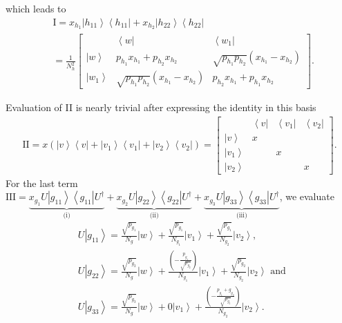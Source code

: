 \documentclass{theoretics}
\begin{document}
which leads to 
\begin{align*}
&\text{I}  =x_{h_{1}}\left|h_{11}\right\rangle \left\langle h_{11}\right|+x_{h_{2}}\left|h_{22}\right\rangle \left\langle h_{22}\right|\\
&=\frac{1}{N_{h}^{2}}\left[\begin{array}{c|cc}
& \left\langle w\right| & \left\langle w_{1}\right|\\
\hline \left|w\right\rangle  & p_{h_{1}}x_{h_{1}}+p_{h_{2}}x_{h_{2}} & \sqrt{p_{h_{1}}p_{h_{2}}}(x_{h_{1}}-x_{h_{2}})\\
\left|w_{1}\right\rangle  & \sqrt{p_{h_{1}}p_{h_{2}}}(x_{h_{1}}-x_{h_{2}}) & p_{h_{2}}x_{h_{1}}+p_{h_{1}}x_{h_{2}}
\end{array}\right].
\end{align*}

Evaluation
of II is nearly trivial after expressing the identity in this basis
\begin{align*}
\text{II}  =x(\left|v\right\rangle \left\langle v\right|+\left|v_{1}\right\rangle \left\langle v_{1}\right|+\left|v_{2}\right\rangle \left\langle v_{2}\right|)=\left[\begin{array}{c|ccc}
& \left\langle v\right| & \left\langle v_{1}\right| & \left\langle v_{2}\right|\\
\hline \left|v\right\rangle  & x\\
\left|v_{1}\right\rangle  &  & x\\
\left|v_{2}\right\rangle  &  &  & x
\end{array}\right].
\end{align*}
For the last term 
$
\text{III}=\underbrace{x_{g_{1}}U\left|g_{11}\right\rangle \left\langle g_{11}\right|U^{\dagger}}_{\text{(i)}}+\underbrace{x_{g_{2}}U\left|g_{22}\right\rangle \left\langle g_{22}\right|U^{\dagger}}_{\text{(ii)}}+\underbrace{x_{g_{3}}U\left|g_{33}\right\rangle \left\langle g_{33}\right|U^{\dagger}}_{\text{(iii)}}
$, 
we evaluate 
\begin{align*}
&U\left|g_{11}\right\rangle   =\frac{\sqrt{p_{g_{1}}}}{N_{g}}\left|w\right\rangle +\frac{\sqrt{p_{g_{1}}}}{N_{g_{1}}}\left|v_{1}\right\rangle +\frac{\sqrt{p_{g_{1}}}}{N_{g_{2}}}\left|v_{2}\right\rangle, \\
&U\left|g_{22}\right\rangle   =\frac{\sqrt{p_{g_{2}}}}{N_{g}}\left|w\right\rangle +\frac{\left(-\frac{p_{g_{1}}}{\sqrt{p_{g_{2}}}}\right)}{N_{g_{1}}}\left|v_{1}\right\rangle +\frac{\sqrt{p_{g_{2}}}}{N_{g_{2}}}\left|v_{2}\right\rangle \text{ and } \\
&U\left|g_{33}\right\rangle   =\frac{\sqrt{p_{g_{3}}}}{N_{g}}\left|w\right\rangle +0\left|v_{1}\right\rangle +\frac{\left(-\frac{p_{g_{1}}+g_{g_{2}}}{\sqrt{p_{g_{3}}}}\right)}{N_{g_{2}}}\left|v_{2}\right\rangle .
\end{align*}
\end{document}
